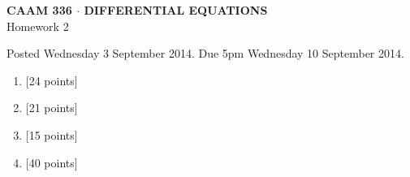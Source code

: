 \documentclass[10pt]{article}
\begin{document}
\vspace*{-5em}
\begin{center}
\large \textsf{\textbf{CAAM 336 $\cdot$ DIFFERENTIAL EQUATIONS}\\[0.5em]
Homework 2 }
\end{center}

Posted Wednesday 3 September 2014. Due 5pm Wednesday 10 September 2014.

\begin{enumerate}\addtocounter{enumi}{0}

\item {[24 points]}  

\item {[21 points]}  

\item {[15 points]}  

\item {[40 points]}  


\end{enumerate}
\end{document}
